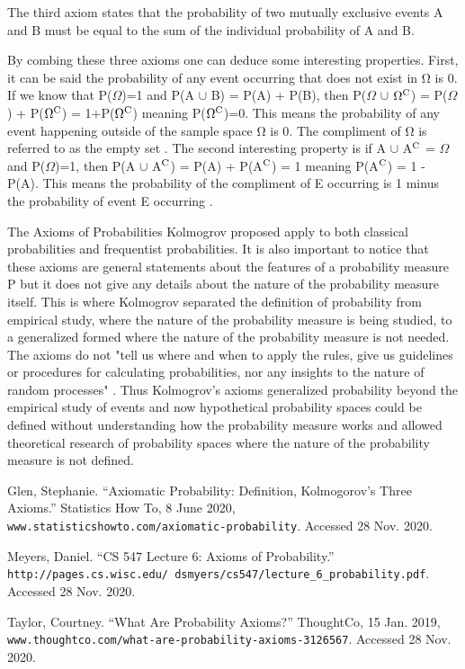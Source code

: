 \documentclass{article}
\begin{document}
The third axiom states that the probability of two mutually exclusive events A and B must be equal to the sum of the individual probability of A and B.

By combing these three axioms one can deduce some interesting properties. First, it can be said the probability of any event occurring that does not exist in Ω is 0. If we know that P($\Omega$)=1 and P(A $\cup$ B) = P(A) + P(B), then P($\Omega$ $\cup$ $\Omega\textsuperscript{C}$) = P($\Omega$) + P($\Omega\textsuperscript{C}$) =  1+P($\Omega\textsuperscript{C}$) meaning P($\Omega\textsuperscript{C}$)=0. This means the probability of any event happening outside of the sample space Ω is 0. The compliment of Ω is referred to as the empty set \cite{taylor}.  
The second interesting property is if A $\cup$ A$\textsuperscript{C}$ = $\Omega$ and P($\Omega$)=1, then P(A $\cup$ A$\textsuperscript{C}$) =  P(A) + P(A$\textsuperscript{C}$) = 1 meaning P(A$\textsuperscript{C}$) = 1 - P(A). This means the probability of the compliment of E occurring is 1 minus the probability of event E occurring \cite{taylor}.

The Axioms of Probabilities Kolmogrov proposed apply to both classical probabilities and frequentist probabilities. It is also important to notice that these axioms are general statements about the features of a probability measure P but it does not give any details about the nature of the probability measure itself. This is where Kolmogrov separated the definition of probability from empirical study, where the nature of the probability measure is being studied, to a generalized formed where the nature of the probability measure is not needed. The axioms do not "tell us where and when to apply the rules, give us guidelines or procedures for calculating probabilities, nor any insights to the nature of random processes" \cite{glen}. Thus Kolmogrov's axioms generalized probability beyond the empirical study of events and now hypothetical probability spaces could be defined without understanding how the probability measure works and allowed theoretical research of probability spaces where the nature of the probability measure is not defined.

\begin{thebibliography}{9}

Glen, Stephanie. 
“Axiomatic Probability: Definition, Kolmogorov’s Three Axioms.”
Statistics How To, 8 June 2020,
\\\texttt{www.statisticshowto.com/axiomatic-probability}.
Accessed 28 Nov. 2020.

Meyers, Daniel. “CS 547 Lecture 6: Axioms of Probability.”
\\\texttt{http://pages.cs.wisc.edu/~dsmyers/cs547/lecture_6_probability.pdf}.
Accessed 28 Nov. 2020.

Taylor, Courtney. 
“What Are Probability Axioms?” ThoughtCo, 15 Jan. 2019,
\\\texttt{www.thoughtco.com/what-are-probability-axioms-3126567}.
Accessed 28 Nov. 2020.

\end{thebibliography}
\end{document}
